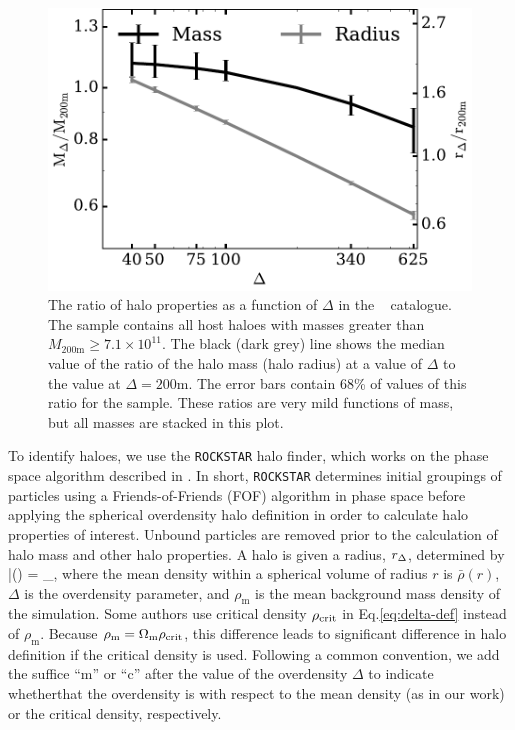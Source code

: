 \documentclass[usenatbib,fleqn]{mnras}
\begin{document}
\begin{figure}
\centering
\includegraphics[width=\columnwidth]{massvsdelta_l0250.pdf}
\caption{
The ratio of halo properties as a function of $\Delta$ in the \simB~ catalogue. The sample contains all host haloes with masses greater than $M_{200\mathrm{m}} \ge 7.1 \times 10^{11}$. The black (dark grey) line shows the median value of the ratio of the halo mass (halo radius) at a value of $\Delta$ to the value at $\Delta=200\mathrm{m}$. The error bars contain 68\% of values of this ratio for the sample. These ratios are 
very mild functions of mass, but all masses are stacked in this plot.}
\label{fig:deltacompare}
\end{figure}

To identify haloes, we use the {\tt ROCKSTAR} halo finder, which works on the phase space algorithm described in \citet{behroozi_etal13a}. In short, {\tt ROCKSTAR} determines initial groupings of particles using a Friends-of-Friends (FOF) algorithm in phase space before applying the spherical overdensity halo definition in order to calculate halo properties of interest. Unbound particles are removed prior to the calculation of halo mass and other halo properties. A halo is given a radius, $r_{\Delta}$, determined by
\beq
\label{eq:delta-def}
	\bar{\rho}(\Rdel) = \Delta \rho_{}, 
\eeq
where the mean density within a spherical volume of radius $r$ is $\bar{\rho}(r)$, $\Delta$ is the overdensity parameter, and $\rho_{\mathrm{m}}$ is the mean background mass density of the simulation. 
Some authors use critical density  $\rho_{\rm crit}$ in Eq.\eqref{eq:delta-def} instead of $\rho_{\mathrm{m}}$. Because $\rho_{\mathrm{m}} = \Omega_{\rm m}\rho_{\rm crit}$, this difference leads to significant difference in halo definition if the critical density is used.
Following a common convention, we add the suffice ``m'' or ``c'' after the value of the overdensity $\Delta$ to indicate whetherthat the overdensity is with respect to the mean density (as in our work) or the critical density, respectively.
\end{document}
